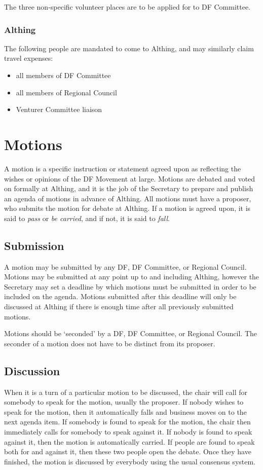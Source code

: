 \documentclass[a4paper, 11pt]{article} %
\begin{document}
The three non-specific volunteer places are to be applied for to DF Committee.

\subsubsection{Althing}
The following people are mandated to come to Althing, and may similarly claim travel expenses:
\begin{itemize}
\item all members of DF Committee
\item all members of Regional Council
\item Venturer Committee liaison
\end{itemize}

\section{Motions}
A motion is a specific instruction or statement agreed upon as reflecting the wishes or opinions of the DF Movement at large.  Motions are debated and voted on formally at Althing, and it is the job of the Secretary to prepare and publish an agenda of motions in advance of Althing.  All motions must have a proposer, who submits the motion for debate at Althing. If a motion is agreed upon, it is said to \emph{pass} or \emph{be carried}, and if not, it is said to \emph{fall}.

\subsection{Submission}
A motion may be submitted by any DF, DF Committee, or Regional Council.  Motions may be submitted at any point up to and including Althing, however the Secretary may set a deadline by which motions must be submitted in order to be included on the agenda.  Motions submitted after this deadline will only be discussed at Althing if there is enough time after all previously submitted motions.

Motions should be `seconded' by a DF, DF Committee, or Regional Council.  The seconder of a motion does not have to be distinct from its proposer.

\subsection{Discussion}
When it is a turn of a particular motion to be discussed, the chair will call for somebody to speak for the motion, usually the proposer.  If nobody wishes to speak for the motion, then it automatically falls and business moves on to the next agenda item.  If somebody is found to speak for the motion, the chair then immediately calls for somebody to speak against it.  If nobody is found to speak against it, then the motion is automatically carried.  If people are found to speak both for and against it, then these two people open the debate.  Once they have finished, the motion is discussed by everybody using the usual consensus system.
\end{document}
